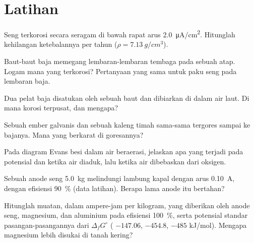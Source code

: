 \section{Latihan}

\begin{exercise}[$\star$]\label{exo:b2:corrosion:1}
Seng terkorosi secara seragam di bawah rapat arus \qty{2.0}{\micro A/cm^2}.
Hitunglah kehilangan ketebalannya per tahun ($\rho = \qty{7.13}{g/cm^3}$).
\end{exercise}

\begin{exercise}[$\star$]\label{exo:b2:corrosion:2}
Baut-baut baja memegang lembaran-lembaran tembaga pada sebuah atap. Logam
mana yang terkorosi? Pertanyaan yang sama untuk paku seng pada lembaran
baja.
\end{exercise}

\begin{exercise}[$\star$]\label{exo:b2:corrosion:3}
Dua pelat baja disatukan oleh sebuah baut dan dibiarkan di dalam air laut.
Di mana korosi terpusat, dan mengapa?
\end{exercise}

\begin{exercise}[$\star$]\label{exo:b2:corrosion:4}
Sebuah ember galvanis dan sebuah kaleng timah sama-sama tergores sampai ke
bajanya. Mana yang berkarat di goresannya?
\end{exercise}

\begin{exercise}[$\star\star$]\label{exo:b2:corrosion:5}
Pada diagram Evans besi dalam air beraerasi, jelaskan apa yang terjadi pada
potensial dan  ketika air diaduk, lalu ketika air dibebaskan
dari oksigen.
\end{exercise}

\begin{exercise}[$\star\star$]\label{exo:b2:corrosion:6}
Sebuah anode seng \qty{5.0}{kg} melindungi lambung kapal dengan arus
\qty{0.10}{A}, dengan efisiensi 90~\% (data latihan). Berapa lama anode itu
bertahan?
\end{exercise}

\begin{exercise}[$\star\star$]\label{exo:b2:corrosion:7}
Hitunglah muatan, dalam ampere-jam per kilogram, yang diberikan oleh anode
seng, magnesium, dan aluminium pada efisiensi 100~\%, serta potensial
standar pasangan-pasangannya dari $\Delta_f G^\circ$ ( $-147.06$,
 $-454.8$,  $-485$ \unit{kJ/mol}). Mengapa magnesium
lebih disukai di tanah kering?
\end{exercise}

